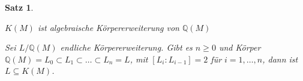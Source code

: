 \documentclass[a4paper,10pt,german]{scrbook}
\theoremstyle{saetze}
\newtheorem{Satz}{Satz}
\theoremstyle{definitionen}
\begin{document}
\begin{Satz}
\begin{enum}
\item $K(M)$ ist algebraische Körpererweiterung von $\mathbb{Q}(M)$
\item Sei $L/\mathbb{Q}(M)$ endliche Körpererweiterung. Gibt es $n
\geq 0$ und Körper $\mathbb{Q}(M) = L_0 \subset L_1 \subset \dots
\subset L_n = L$, mit $[L_i : L_{i-1}] = 2$ für $i=1,\dots,n$, dann
ist $L \subseteq K(M)$.
\end{enum}




\end{Satz}
\end{document}
